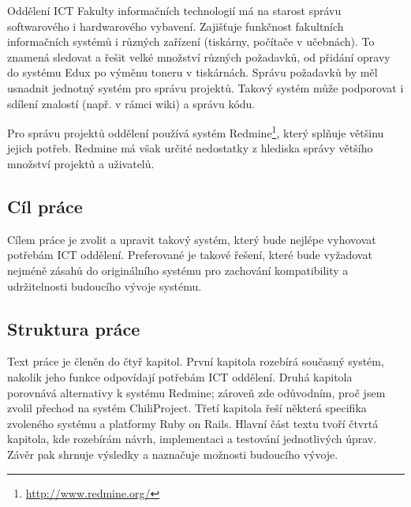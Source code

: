 \documentclass[thesis=B,czech]{FITthesis}[2012/05/02]
\begin{document}

\begin{introduction}

Oddělení ICT Fakulty informačních technologií má na starost správu softwarového i hardwarového vybavení. Zajišťuje funkčnost fakultních informačních systémů i různých zařízení (tiskárny, počítače v učebnách). To znamená sledovat a řešit velké množství různých požadavků, od přidání opravy do systému Edux po výměnu toneru v tiskárnách. Správu požadavků by měl usnadnit jednotný systém pro správu projektů. Takový systém může podporovat i sdílení znalostí (např. v rámci \gls{wiki}) a správu kódu.

Pro správu projektů oddělení používá systém Redmine\footnote{\url{http://www.redmine.org/}}, který splňuje většinu jejich potřeb. Redmine má však určité nedostatky z hlediska správy většího množství projektů a uživatelů.

\subsection{Cíl práce}

Cílem práce je zvolit a upravit takový systém, který bude nejlépe vyhovovat potřebám ICT oddělení. Preferované je takové řešení, které bude vyžadovat nejméně zásahů do originálního systému pro zachování kompatibility a udržitelnosti budoucího vývoje systému.

\subsection{Struktura práce}

Text práce je členěn do čtyř kapitol. První kapitola rozebírá současný systém, nakolik jeho funkce odpovídají potřebám ICT oddělení. Druhá kapitola porovnává alternativy k systému Redmine; zároveň zde odůvodním, proč jsem zvolil přechod na systém ChiliProject. Třetí kapitola řeší některá specifika zvoleného systému a platformy Ruby on Rails. Hlavní část textu tvoří čtvrtá kapitola, kde rozebírám návrh, implementaci a testování jednotlivých úprav. Závěr pak shrnuje výsledky a naznačuje možnosti budoucího vývoje.

\end{introduction}
\end{document}
